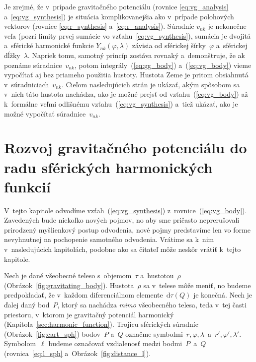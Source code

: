 \documentclass[a4paper, 12pt]{book}
\newcommand{\diff}{\mathrm d}
\begin{document}
Je zrejmé, že v~prípade gravitačného potenciálu (rovnice \ref{eq:vg_analysis}
a~\ref{eq:vg_synthesis}) je situácia komplikovanejšia ako v~prípade polohových
vektorov (rovnice \ref{eq:r_synthesis} a~\ref{eq:r_analysis}).  Súradníc
$v_{nk}$ je nekonečne veľa (pozri limity prvej sumácie vo
vzťahu~\ref{eq:vg_synthesis}), sumácia je dvojitá a~sférické harmonické funkcie
$Y_{nk}(\varphi, \lambda)$ závisia od sférickej šírky~$\varphi$ a~sférickej
dĺžky~$\lambda$.  Napriek tomu, samotný princíp zostáva rovnaký a~demonštruje, 
že ak poznáme súradnice~$v_{nk}$, potom
integrály~(\ref{eq:gg_body}) a~(\ref{eq:vg_body}) vieme vypočítať aj bez
priameho použitia hustoty.  Hustota Zeme je pritom obsiahnutá 
v~súradniciach~$v_{nk}$.  Cieľom nasledujúcich strán je ukázať, akým spôsobom 
sa v~nich táto hustota nachádza, ako je možné prejsť od 
vzťahu~(\ref{eq:vg_body}) až k~formálne veľmi odlišnému 
vzťahu~(\ref{eq:vg_synthesis}) a~tiež ukázať, ako je možné vypočítať 
súradnice~$v_{nk}$.



\section{Rozvoj gravitačného potenciálu do radu sférických harmonických
funkcií}
\label{sec:vg_sh_expansion}

V~tejto kapitole odvodíme vzťah~(\ref{eq:vg_synthesis})
z~rovnice~(\ref{eq:vg_body}).  Zavedených bude niekoľko nových pojmov, no aby 
sme pričasto neprerušovali prirodzený myšlienkový postup odvodenia, nové pojmy
predstavíme len vo forme nevyhnutnej na pochopenie samotného odvodenia.
Vrátime sa k~nim v~nasledujúcich kapitolách, podobne ako sa čitateľ môže neskôr 
vrátiť k~tejto kapitole.

Nech je dané všeobecné teleso s~objemom~$\tau$ a~hustotou~$\rho$
(Obrázok~\ref{fig:gravitating_body}).  Hustota~$\rho$ sa v~telese môže meniť,
no budeme predpokladať, že v~každom diferenciálnom elemente~$\diff \tau(Q)$ je
konečná.  Nech je ďalej daný bod~$P$, ktorý sa nachádza \emph{mimo} všeobecného
telesa, teda v~tej časti priestoru, v~ktorom je gravitačný potenciál harmonický
(Kapitola~\ref{sec:harmonic_function}).  Trojicu sférických súradníc 
(Obrázok~\ref{fig:cart_sph}) bodov~$P$ a~$Q$ označme symbolmi~$r, \varphi,
\lambda$~a~$r', \varphi', \lambda'$.  Symbolom~$\ell$ budeme označovať 
vzdialenosť medzi bodmi~$P$~a~$Q$ (rovnica~\ref{eq:l_sph} 
a~Obrázok~\ref{fig:distance_l}).
\end{document}
